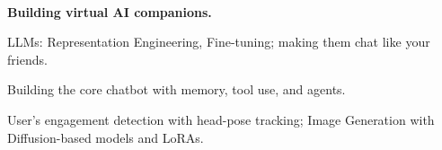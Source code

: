 \\
\vspace{-.2em}
\begin{xitemize}
    \item \textbf{Building virtual AI companions.}
    \begin{zitemize}
        \item LLMs: Representation Engineering, Fine-tuning; making them chat like your friends.
        \item Building the core chatbot with memory, tool use, and agents.
        \item User's engagement detection with head-pose tracking; Image Generation with
Diffusion-based models and LoRAs.
    \end{zitemize}
\end{xitemize}

